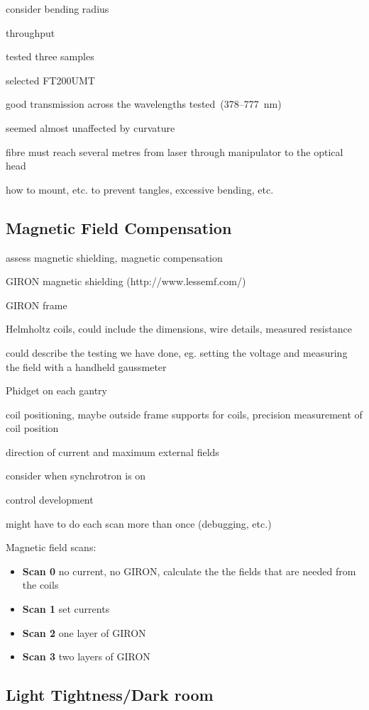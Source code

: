 consider bending radius

throughput

tested three samples

selected FT200UMT

good transmission across the wavelengths tested~(378--777~nm)

seemed almost unaffected by curvature

fibre must reach several metres from laser through manipulator to the
optical head

how to mount, etc. to prevent tangles, excessive bending, etc.

\subsection{Magnetic Field Compensation}

assess magnetic shielding, magnetic compensation

GIRON magnetic shielding (http://www.lessemf.com/)

GIRON frame

Helmholtz coils, could include the dimensions, wire details,
measured resistance

could describe the testing we have done, eg. setting the voltage and
measuring the field with a handheld gaussmeter

Phidget on each gantry


coil positioning, maybe outside frame supports for coils, precision measurement of coil position

direction of current and maximum external fields

consider when synchrotron is on

control development

might have to do each scan more than once (debugging, etc.)

Magnetic field scans:
\begin{itemize}
\item{\bf Scan 0} no current, no GIRON, calculate the the fields that are needed from the coils
\item{\bf Scan 1} set currents
\item{\bf Scan 2} one layer of GIRON
\item{\bf Scan 3} two layers of GIRON
\end{itemize}


\subsection{Light Tightness/Dark room}

